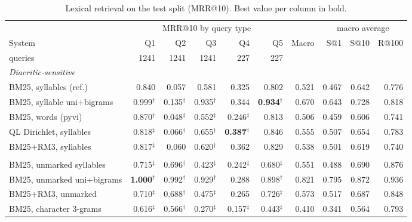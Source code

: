 \begin{table}[t]
\centering
\caption{Lexical retrieval on the test split (MRR@10). Best value per column in bold.}
\label{tab:lexical}
\footnotesize
\setlength{\tabcolsep}{3.3pt}
\begin{tabular}{@{}l rrrrr r rrr@{}}
\toprule
 & \multicolumn{5}{c}{MRR@10 by query type} & & \multicolumn{3}{c}{macro average} \\
\cmidrule(lr){2-6} \cmidrule(l){8-10}
System & Q1 & Q2 & Q3 & Q4 & Q5 & Macro & S@1 & S@10 & R@100 \\
 \scriptsize{queries} & \scriptsize{1241} & \scriptsize{1241} & \scriptsize{1241} & \scriptsize{227} & \scriptsize{227} & & & & \\
\midrule
\multicolumn{10}{l}{\textit{Diacritic-sensitive}} \\
\quad BM25, syllables (ref.) & 0.840 & 0.057 & 0.581 & 0.325 & 0.802 & 0.521 & 0.467 & 0.642 & 0.776 \\
\quad BM25, syllable uni+bigrams & 0.999$^{\dagger}$ & 0.135$^{\dagger}$ & 0.935$^{\dagger}$ & 0.344 & \textbf{0.934}$^{\dagger}$ & 0.670 & 0.643 & 0.728 & 0.818 \\
\quad BM25, words (pyvi) & 0.870$^{\dagger}$ & 0.048$^{\ddagger}$ & 0.552$^{\ddagger}$ & 0.246$^{\ddagger}$ & 0.813 & 0.506 & 0.459 & 0.606 & 0.741 \\
\quad QL Dirichlet, syllables & 0.818$^{\ddagger}$ & 0.066$^{\dagger}$ & 0.655$^{\dagger}$ & \textbf{0.387}$^{\dagger}$ & 0.846 & 0.555 & 0.507 & 0.654 & 0.783 \\
\quad BM25+RM3, syllables & 0.817$^{\ddagger}$ & 0.060 & 0.620$^{\dagger}$ & 0.362 & 0.829 & 0.538 & 0.501 & 0.619 & 0.740 \\
\addlinespace
\multicolumn{10}{l}{\textit{Diacritic-insensitive}} \\
\quad BM25, unmarked syllables & 0.715$^{\ddagger}$ & 0.696$^{\dagger}$ & 0.423$^{\ddagger}$ & 0.242$^{\ddagger}$ & 0.680$^{\ddagger}$ & 0.551 & 0.488 & 0.690 & 0.876 \\
\quad BM25, unmarked uni+bigrams & \textbf{1.000}$^{\dagger}$ & 0.992$^{\dagger}$ & 0.929$^{\dagger}$ & 0.288 & 0.898$^{\dagger}$ & 0.821 & 0.795 & 0.872 & 0.936 \\
\quad BM25+RM3, unmarked & 0.710$^{\ddagger}$ & 0.688$^{\dagger}$ & 0.475$^{\ddagger}$ & 0.265 & 0.726$^{\ddagger}$ & 0.573 & 0.517 & 0.687 & 0.848 \\
\quad BM25, character 3-grams & 0.616$^{\ddagger}$ & 0.566$^{\dagger}$ & 0.270$^{\ddagger}$ & 0.157$^{\ddagger}$ & 0.443$^{\ddagger}$ & 0.410 & 0.341 & 0.564 & 0.793 \\

\end{tabular}
\end{table}
